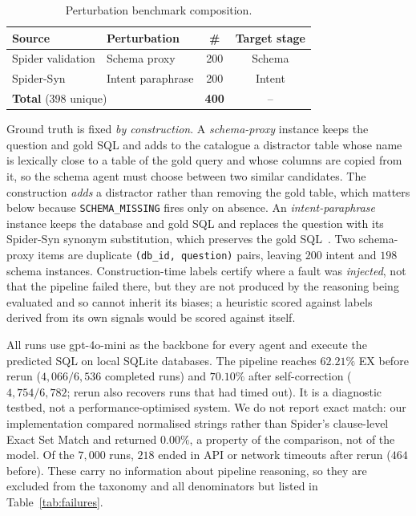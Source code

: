 \documentclass{llncs}
\begin{document}
\begin{table}[t]
\centering
\caption{Perturbation benchmark composition.}
\label{tab:benchmark}
\small
\begin{tabular}{llcc}
\toprule
Source & Perturbation & \# & Target stage \\
\midrule
Spider validation & Schema proxy      & 200 & Schema \\
Spider-Syn        & Intent paraphrase & 200 & Intent \\
\midrule
\multicolumn{2}{l}{\textbf{Total} (398 unique)} & \textbf{400} & -- \\
\bottomrule
\end{tabular}
\end{table}

Ground truth is fixed \emph{by construction}. A \emph{schema-proxy} instance
keeps the question and gold SQL and adds to the catalogue a distractor table
whose name is lexically close to a table of the gold query and whose columns
are copied from it, so the schema agent must choose between two similar
candidates. The construction \emph{adds} a distractor rather than removing the
gold table, which matters below because \texttt{SCHEMA\_MISSING} fires only on
absence. An \emph{intent-paraphrase} instance keeps the database and gold SQL
and replaces the question with its Spider-Syn synonym substitution, which
preserves the gold SQL~\cite{gan_spider_syn_2021}. Two schema-proxy items are
duplicate \texttt{(db\_id, question)} pairs, leaving $200$ intent and $198$
schema instances. Construction-time labels certify where a fault was
\emph{injected}, not that the pipeline failed there, but they are not produced
by the reasoning being evaluated and so cannot inherit its biases; a heuristic
scored against labels derived from its own signals would be scored against
itself.

All runs use gpt-4o-mini as the backbone for every agent and execute the
predicted SQL on local SQLite databases. The pipeline reaches $62.21\%$ EX
before rerun ($4{,}066/6{,}536$ completed runs) and $70.10\%$ after
self-correction ($4{,}754/6{,}782$; rerun also recovers runs that had timed
out). It is a diagnostic testbed, not a performance-optimised system. We do
not report exact match: our implementation compared normalised strings rather
than Spider's clause-level Exact Set Match and returned $0.00\%$, a property of
the comparison, not of the model. Of the $7{,}000$ runs, $218$ ended in API or
network timeouts after rerun ($464$ before). These carry no information about
pipeline reasoning, so they are excluded from the taxonomy and all
denominators but listed in Table~\ref{tab:failures}.
\end{document}
